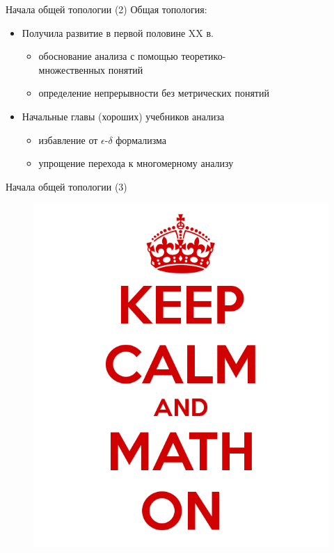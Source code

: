 \documentclass{beamer}
\begin{document}
\begin{frame}{Начала общей топологии (2)}
Общая топология:\\
\bigskip
\begin{itemize}
	\item Получила развитие в первой половине XX в.
		\begin{itemize}
			\item обоснование анализа с помощью теоретико-\\множественных понятий
			\item определение непрерывности без метрических понятий
		\end{itemize}
	\bigskip
	\item Начальные главы (хороших) учебников анализа
		\begin{itemize}
			\item избавление от $\epsilon$-$\delta$ формализма
			\item упрощение перехода к многомерному анализу
		\end{itemize}
\end{itemize}
\end{frame}

\begin{frame}{Начала общей топологии (3)}
\begin{center}
	\begin{figure}[H]
		\includegraphics[scale=0.3]{keep_calm.png} 
	\end{figure}
\end{center}
\end{frame}
\end{document}
